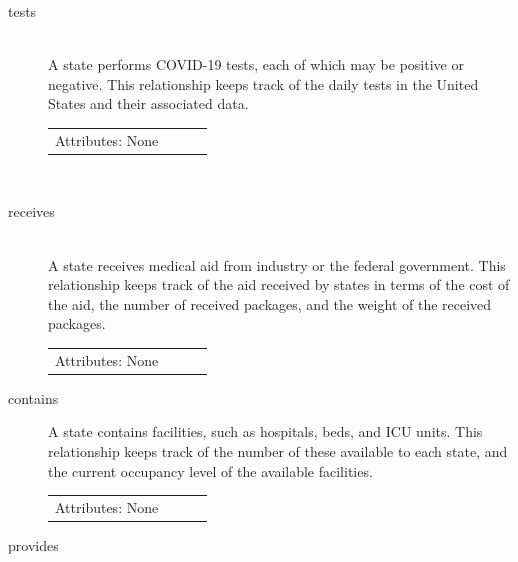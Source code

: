\documentclass[11pt]{article}
\begin{document}
\begin{description}
\item [tests] \\

\noindent
A state performs COVID-19 tests, each of which may be positive or negative. This relationship keeps track of the daily tests in the United States and their associated data.

\begin{tabular}{lllc}  
  Attributes: None \\
\end{tabular} \\

\item [receives] \\

\noindent
A state receives medical aid from industry or the federal government. This relationship keeps track of the aid received by states in terms of the cost of the aid, the number of received packages, and the weight of the received packages.

\begin{tabular}{lllc}
     Attributes: None \\
\end{tabular}




\item [contains]

\noindent
A state contains facilities, such as hospitals, beds, and ICU units. This relationship keeps track of the number of these available to each state, and the current occupancy level of the available facilities.

\begin{tabular}{lllc}
    Attributes: None \\
\end{tabular}

\item [provides]


\end{description}
\end{document}

